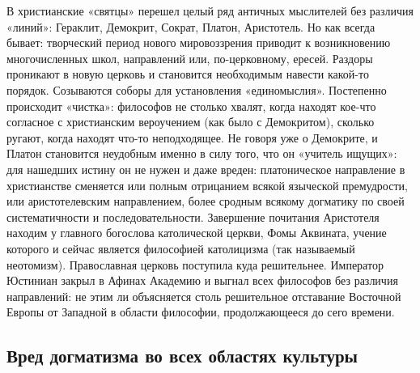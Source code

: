 В христианские «святцы» перешел целый ряд античных мыслителей без
различия «линий»: Гераклит, Демокрит, Сократ, Платон, Аристотель. Но
как всегда бывает: творческий период нового мировоззрения приводит к
возникновению многочисленных школ, направлений или, по-церковному,
ересей. Раздоры проникают в новую церковь и становится необходимым
навести какой-то порядок. Созываются соборы для установления
«единомыслия». Постепенно происходит «чистка»: философов не столько
хвалят, когда находят кое-что согласное с христианским вероучением
(как было с Демокритом), сколько ругают, когда находят что-то
неподходящее. Не говоря уже о Демокрите, и Платон становится неудобным
именно в силу того, что он «учитель ищущих»: для нашедших истину он не
нужен и даже вреден: платоническое направление в христианстве
сменяется или полным отрицанием всякой языческой премудрости, или
аристотелевским направлением, более сродным всякому догматику по своей
систематичности и последовательности. Завершение почитания Аристотеля
находим у главного богослова католической церкви, Фомы Аквината,
учение которого и сейчас является философией католицизма (так
называемый неотомизм). Православная церковь поступила куда
решительнее. Император Юстиниан закрыл в Афинах Академию и выгнал всех
философов без различия направлений: не этим ли объясняется столь
решительное отставание Восточной Европы от Западной в области
философии, продолжающееся до сего времени.

\subsection{Вред догматизма во всех областях культуры}


